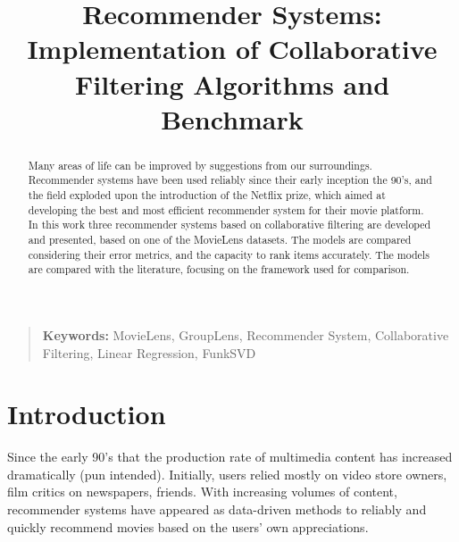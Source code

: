 \documentclass[conference]{IEEEtran}
\begin{document}
\title{Recommender Systems: Implementation of Collaborative Filtering Algorithms and Benchmark}

\author{
\and
{}
}

\maketitle
\thispagestyle{plain}

\begin{abstract}
Many areas of life can be improved by suggestions from our surroundings. Recommender systems have been used reliably since their early inception the 90's, and the field exploded upon the introduction of the Netflix prize, which aimed at developing the best and most efficient recommender system for their movie platform. In this work three recommender systems based on collaborative filtering are developed and presented, based on one of the MovieLens datasets. The models are compared considering their error metrics, and the capacity to rank items accurately. The models are compared with the literature, focusing on the framework used for comparison. %
\end{abstract}

\begin{quote}
\small
\noindent
\textbf{Keywords:} MovieLens, GroupLens, Recommender System, Collaborative Filtering, Linear Regression, FunkSVD %
\end{quote}

\IEEEpeerreviewmaketitle


\section{Introduction}

Since the early 90's that the production rate of multimedia content has increased dramatically (pun intended). Initially, users relied mostly on video store owners, film critics on newspapers, friends. With increasing volumes of content, recommender systems have appeared as data-driven methods to reliably and quickly recommend movies based on the users' own appreciations.
\end{document}
